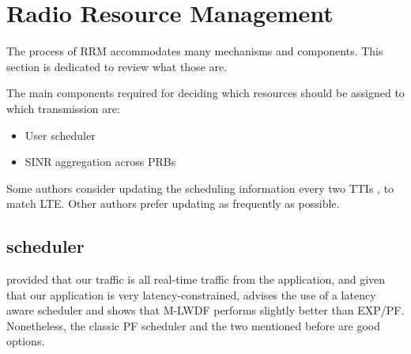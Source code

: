 \section{Radio Resource Management}
\label{sec:rrm}

The process of \ac{RRM} accommodates many mechanisms and components. This section is dedicated to review what those are.

The main components required for deciding which resources should be assigned to which transmission are:
\begin{itemize}
    \item User scheduler
    \item SINR aggregation across PRBs
\end{itemize}



Some authors consider updating the scheduling information every two TTIs \cite{7986957}, to match LTE. Other authors \cite{dmimo-remco} prefer updating as frequently as possible. 



\subsection*{scheduler}

provided that our traffic is all real-time traffic from the application, and given that our application is very latency-constrained, \cite{7020879} advises the use of a latency aware scheduler and shows that \ac{M-LWDF} performs slightly better than \ac{EXP/PF}. Nonetheless, the classic \ac{PF} scheduler and the two mentioned before are good options.